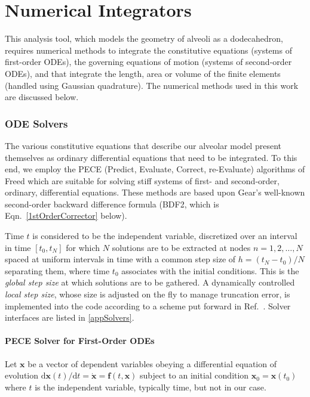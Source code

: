 \part{Numerical Integrators}
\label{partNumericalMethods}

This analysis tool, which models the geometry of alveoli as a dodecahedron, requires numerical methods to integrate the constitutive equations (systems of first-order ODEs), the governing equations of motion (systems of second-order ODEs), and that integrate the length, area or volume of the finite elements (handled using Gaussian quadrature).  The numerical methods used in this work are discussed below.

\section{ODE Solvers}

The various constitutive equations that describe our alveolar model present themselves as ordinary differential equations that need to be integrated.  To this end, we employ the PECE (Predict, Evaluate, Correct, re-Evaluate) algorithms of Freed \cite{Freed17a} which are suitable for solving stiff systems of first- and second-order, ordinary, differential equations.  These methods are based upon Gear's well-known second-order backward difference formula (BDF2, which is Eqn.~\ref{1stOrderCorrector} below).

Time $t$ is considered to be the independent variable, discretized over an interval in time $[t_0, t_N]$ for which $N$ solutions are to be extracted at nodes $n=1, 2, \ldots, N$ spaced at uniform intervals in time with a common step size of $h = (t_N - t_0)/N$ separating them, where time $t_0$ associates with the initial conditions.  This is the \textit{global step size\/} at which solutions are to be gathered.  A dynamically controlled \textit{local step size}, whose size is adjusted on the fly to manage truncation error, is implemented into the code according to a scheme put forward in Ref.~\cite{Soderlind02}.  Solver interfaces are listed in \ref{appSolvers}.

\subsection{PECE Solver for First-Order ODEs}

Let $\mathbf{x}$ be a vector of dependent variables obeying a differential equation of evolution $\mathrm{d} \mathbf{x}(t) / \mathrm{d} t = \dot{\mathbf{x}} = \mathbf{f} (t, \mathbf{x})$ subject to an initial condition $\mathbf{x}_0 = \mathbf{x}(t_0)$ where $t$ is the independent variable, typically time, but not in our case.

